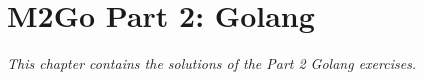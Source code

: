 \chapter{M2Go Part 2: Golang}
\label{cha:golang}
\textit{This chapter contains the solutions of the Part 2 Golang exercises.}









